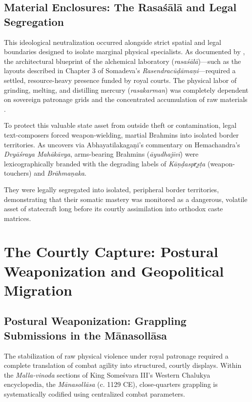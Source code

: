 \documentclass[11pt,twoside,letterpaper]{article}
\begin{document}
\subsection{Material Enclosures: The Rasaśālā and Legal Segregation}
This ideological neutralization occurred alongside strict spatial and legal boundaries designed to isolate marginal physical specialists. As documented by \citet{Wujastyk2025}, the architectural blueprint of the alchemical laboratory (\textit{rasaśālā})—such as the layouts described in Chapter 3 of Somadeva’s \textit{Rasendracūḍāmaṇi}—required a settled, resource-heavy presence funded by royal courts. The physical labor of grinding, melting, and distilling mercury (\textit{rasakarman}) was completely dependent on sovereign patronage grids and the concentrated accumulation of raw materials \citep{Wujastyk2025}.

To protect this valuable state asset from outside theft or contamination, legal text-composers forced weapon-wielding, martial Brahmins into isolated border territories. As \citet{Sandesara1948} uncovers via Abhayatilakagaṇi’s commentary on Hemachandra’s \textit{Dvyāśraya Mahākāvya}, arms-bearing Brahmins (\textit{āyudhajīvī}) were lexicographically branded with the degrading labels of \textit{Kāṇḍaspr̥ṣṭa} (weapon-touchers) and \textit{Brāhmaṇaka}. 

They were legally segregated into isolated, peripheral border territories, demonstrating that their somatic mastery was monitored as a dangerous, volatile asset of statecraft long before its courtly assimilation into orthodox caste matrices.

\section{The Courtly Capture: Postural Weaponization and Geopolitical Migration}

\subsection{Postural Weaponization: Grappling Submissions in the Mānasollāsa}
The stabilization of raw physical violence under royal patronage required a complete translation of combat agility into structured, courtly displays. Within the \textit{Malla-vinoda} sections of King Someśvara III’s Western Chalukya encyclopedia, the \textit{Mānasollāsa} (c. 1129 CE), close-quarters grappling is systematically codified using centralized combat parameters. 
\end{document}
